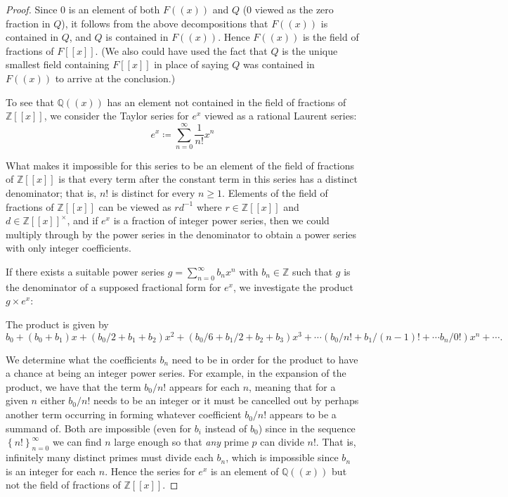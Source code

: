 \documentclass[11pt]{article}
\newcommand{\cbr}[1]{\left\{#1\right\}}
\begin{document}
\begin{enumerate}
\begin{proof}
        Since $0$ is an element of both $F((x))$ and $Q$ ($0$ viewed as the zero fraction in $Q$), it follows from the above decompositions that $F((x))$ is contained in $Q$, and $Q$ is contained in $F((x))$. Hence $F((x))$ is the field of fractions of $F[[x]]$. (We also could have used the fact that $Q$ is the unique smallest field containing $F[[x]]$ in place of saying $Q$ was contained in $F((x))$ to arrive at the conclusion.)

        To see that $\mathbb{Q}((x))$ has an element not contained in the field of fractions of $\mathbb{Z}[[x]]$, we consider the Taylor series for $e^x$ viewed as a rational Laurent series: \[e^x\coloneqq \sum_{n=0}^\infty \frac{1}{n!}x^n\]

        What makes it impossible for this series to be an element of the field of fractions of $\mathbb{Z}[[x]]$ is that every term after the constant term in this series has a distinct denominator; that is, $n!$ is distinct for every $n\geq 1$. Elements of the field of fractions of $\mathbb{Z}[[x]]$ can be viewed as $rd^{-1}$ where $r\in \mathbb{Z}[[x]]$ and $d\in \mathbb{Z}[[x]]^\times$, and if $e^x$ is a fraction of integer power series, then we could multiply through by the power series in the denominator to obtain a power series with only integer coefficients. 

        If there exists a suitable power series $g = \sum_{n=0}^\infty b_nx^n$ with $b_n\in \mathbb{Z}$ such that $g$ is the denominator of a supposed fractional form for $e^x$, we investigate the product $g\times e^x$:

        The product is given by \[b_0 + (b_0+b_1)x + (b_0/2 + b_1 + b_2)x^2 + (b_0/6 + b_1/2 + b_2 + b_3)x^3 + \cdots (b_0/n! + b_1/(n-1)! + \cdots b_n/0!)x^n + \cdots.\]

        We determine what the coefficients $b_n$ need to be in order for the product to have a chance at being an integer power series. For example, in the expansion of the product, we have that the term $b_0/n!$ appears for each $n$, meaning that for a given $n$ either $b_0/n!$ needs to be an integer or it must be cancelled out by perhaps another term occurring in forming whatever coefficient $b_0/n!$ appears to be a summand of. Both are impossible (even for $b_i$ instead of $b_0$) since in the sequence $\cbr{n!}_{n=0}^{\infty}$ we can find $n$ large enough so that \textit{any} prime $p$ can divide $n!$. That is, infinitely many distinct primes must divide each $b_n$, which is impossible since $b_n$ is an integer for each $n$. Hence the series for $e^x$ is an element of $\mathbb{Q}((x))$ but not the field of fractions of $\mathbb{Z}[[x]]$.
        \end{proof}
\end{enumerate}
\end{document}
